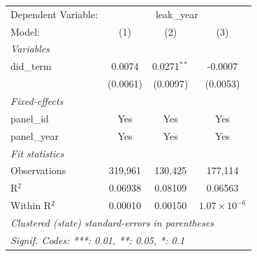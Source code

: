 
\begingroup
\centering
\begin{tabular}{lccc}
   \tabularnewline \midrule \midrule
   Dependent Variable: & \multicolumn{3}{c}{leak\_year}\\
   Model:       & (1)      & (2)           & (3)\\  
   \midrule
   \emph{Variables}\\
   did\_term    & 0.0074   & 0.0271$^{**}$ & -0.0007\\   
                & (0.0061) & (0.0097)      & (0.0053)\\   
   \midrule
   \emph{Fixed-effects}\\
   panel\_id    & Yes      & Yes           & Yes\\  
   panel\_year  & Yes      & Yes           & Yes\\  
   \midrule
   \emph{Fit statistics}\\
   Observations & 319,961  & 130,425       & 177,114\\  
   R$^2$        & 0.06938  & 0.08109       & 0.06563\\  
   Within R$^2$ & 0.00010  & 0.00150       & $1.07\times 10^{-6}$\\   
   \midrule \midrule
   \multicolumn{4}{l}{\emph{Clustered (state) standard-errors in parentheses}}\\
   \multicolumn{4}{l}{\emph{Signif. Codes: ***: 0.01, **: 0.05, *: 0.1}}\\
\end{tabular}
\par\endgroup


